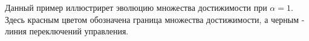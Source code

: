 \documentclass[11pt]{article}
\begin{document}
\newpage
{}
Данный пример иллюстрирет эволюцию множества достижимости при \( \alpha = 1 \). Здесь красным цветом обозначена граница множества достижимости, а черным - линия переключений управления.
\begin{figure}[h]
    \centering
    \qquad
    \\
    \qquad
\end{figure}
\end{document}
